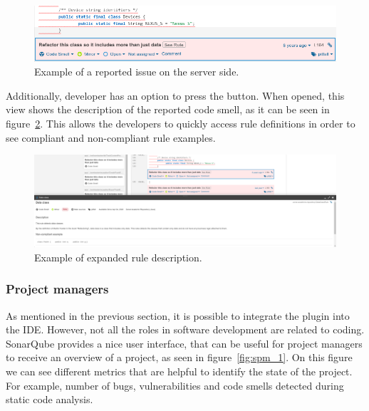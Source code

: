 \begin{figure}
    \includegraphics[scale=0.5]{figures/dev_1.png}
    \caption{Example of a reported issue on the server side.}
    \label{fig:dev_1}
\end{figure}

Additionally, developer has an option to press the  button.
When opened, this view shows the description of the reported code smell, as it can be seen in figure~\ref{fig:dev_2}.
This allows the developers to quickly access rule definitions in order to see compliant and non-compliant rule examples.

\begin{figure}
    \includegraphics[scale=0.25]{figures/dev_2.png}
    \caption{Example of expanded rule description.}
    \label{fig:dev_2}
\end{figure}

\FloatBarrier

\subsubsection{Project managers}


As mentioned in the previous section, it is possible to integrate the plugin into the IDE.
However, not all the roles in software development are related to coding.
SonarQube provides a nice user interface, that can be useful for project managers to receive an overview of a project,
as seen in figure~\ref{fig:spm_1}.
On this figure we can see different metrics that are helpful to identify the state of the project.
For example, number of bugs, vulnerabilities and code smells detected during static code analysis.

